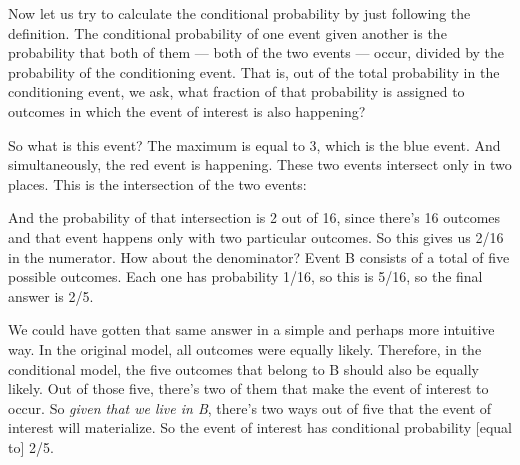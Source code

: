 \documentclass[pdftex, brazil, 12pt, twoside]{article}
\begin{document}
Now let us try to calculate the conditional probability by
just following the definition.
The conditional probability of one event given another is the
probability that both of them ---
both of the two events ---
occur, divided by the probability of the
conditioning event.
That is, out of the total probability in the
conditioning event, we ask, what fraction of that
probability is assigned to outcomes in which the event of
interest is also happening?

So what is this event?
The maximum is equal to 3, which is the blue event.
And simultaneously, the red event is happening.
These two events intersect only in two places.
This is the intersection of the two events:

\begin{figure}[H]
  \begin{center}
  \end{center}
\end{figure}

And the probability of that intersection is 2 out of 16,
since there's 16 outcomes and that event happens only with
two particular outcomes.
So this gives us 2/16 in the numerator.
How about the denominator?
Event B consists of a total of five possible outcomes.
Each one has probability 1/16, so this is 5/16, so the final
answer is 2/5.

We could have gotten that same answer in a simple and perhaps
more intuitive way.
In the original model, all outcomes were equally likely.
Therefore, in the conditional model, the five outcomes that
belong to B should also be equally likely.
Out of those five, there's two of them that make the event of
interest to occur.
So \emph{given that we live in B}, there's two ways out of five
that the event of interest will materialize.
So the event of interest has
conditional probability [equal to]
2/5.
\end{document}
